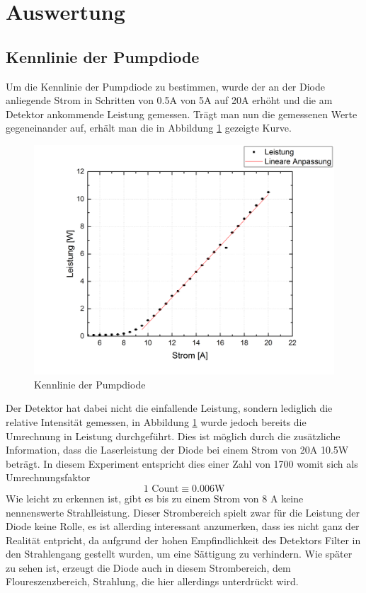 \section{Auswertung}
\subsection{Kennlinie der Pumpdiode}
\label{diode}
Um die Kennlinie der Pumpdiode zu bestimmen, wurde der an der Diode anliegende Strom in Schritten von 0.5A von 5A auf 20A erhöht und die am Detektor ankommende Leistung gemessen. \newline
Trägt man nun die gemessenen Werte gegeneinander auf, erhält man die in Abbildung \ref{kennpump} gezeigte Kurve.
\begin{figure}[H]
	    \centering
		\includegraphics[scale=.5]{Bilder/Pumplaser.png}
		\caption{Kennlinie der Pumpdiode}
		\label{kennpump}
\end{figure}
Der Detektor hat dabei nicht die einfallende Leistung, sondern lediglich die relative Intensität gemessen, in Abbildung \ref{kennpump} wurde jedoch bereits die Umrechnung in Leistung durchgeführt. Dies ist möglich durch die zusätzliche Information, dass die Laserleistung der Diode bei einem Strom von 20A 10.5W beträgt. In diesem Experiment entspricht dies einer Zahl von 1700 womit sich als Umrechnungsfaktor
\begin{equation}
1 \text{ Count}\equiv 0.006\text{W}
\end{equation}
Wie leicht zu erkennen ist, gibt es bis zu einem Strom von 8 A keine nennenswerte Strahlleistung. Dieser Strombereich spielt zwar für die Leistung der Diode keine Rolle, es ist allerding interessant anzumerken, dass ies nicht ganz der Realität entpricht, da aufgrund der hohen Empfindlichkeit des Detektors Filter in den Strahlengang gestellt wurden, um eine Sättigung zu verhindern. Wie später zu sehen ist, erzeugt die Diode auch in diesem Strombereich, dem Floureszenzbereich, Strahlung, die hier allerdings unterdrückt wird.  \newline
